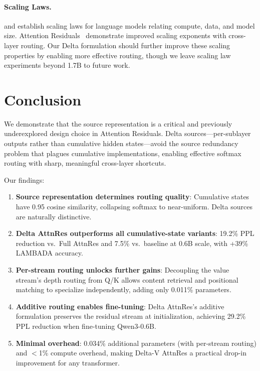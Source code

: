 \documentclass{article}
\begin{document}
\paragraph{Scaling Laws.} \citet{kaplan2020scaling} and \citet{hoffmann2022chinchilla} establish scaling laws for language models relating compute, data, and model size. Attention Residuals~\citep{kimi2025attention} demonstrate improved scaling exponents with cross-layer routing. Our Delta formulation should further improve these scaling properties by enabling more effective routing, though we leave scaling law experiments beyond 1.7B to future work.

\section{Conclusion}

We demonstrate that the source representation is a critical and previously underexplored design choice in Attention Residuals. Delta sources---per-sublayer outputs rather than cumulative hidden states---avoid the source redundancy problem that plagues cumulative implementations, enabling effective softmax routing with sharp, meaningful cross-layer shortcuts.

Our findings:
\begin{enumerate}
    \item \textbf{Source representation determines routing quality}: Cumulative states have 0.95 cosine similarity, collapsing softmax to near-uniform. Delta sources are naturally distinctive.
    \item \textbf{Delta AttnRes outperforms all cumulative-state variants}: 19.2\% PPL reduction vs.\ Full AttnRes and 7.5\% vs.\ baseline at 0.6B scale, with +39\% LAMBADA accuracy.
    \item \textbf{Per-stream routing unlocks further gains}: Decoupling the value stream's depth routing from Q/K allows content retrieval and positional matching to specialize independently, adding only 0.011\% parameters.
    \item \textbf{Additive routing enables fine-tuning}: Delta AttnRes's additive formulation preserves the residual stream at initialization, achieving 29.2\% PPL reduction when fine-tuning Qwen3-0.6B.
    \item \textbf{Minimal overhead}: 0.034\% additional parameters (with per-stream routing) and $<$1\% compute overhead, making Delta-V AttnRes a practical drop-in improvement for any transformer.
\end{enumerate}
\end{document}
